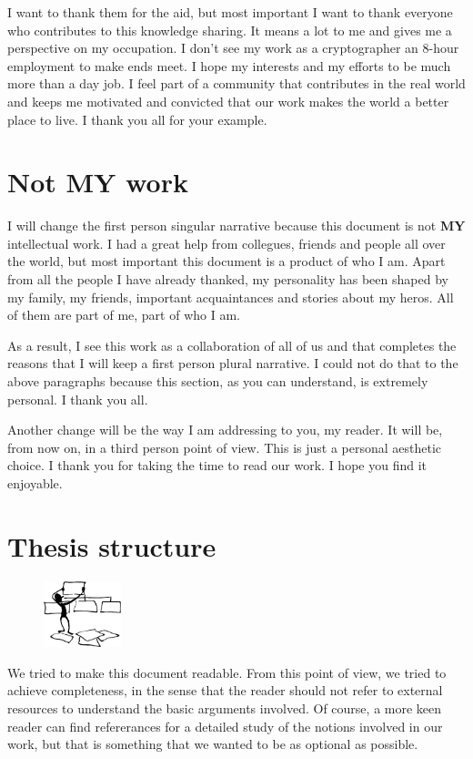 I want to thank them for the aid, but most important I want to thank everyone who contributes to this knowledge sharing. It means a lot to me and gives me a perspective on my occupation. I don't see my work as a cryptographer an 8-hour employment to make ends meet. I hope my interests and my efforts to be much more than a day job. I feel part of a community that contributes in the real world and keeps me motivated and convicted that our work makes the world a better place to live. I thank you all for your example.
%
\section{Not MY work}
I will change the first person singular narrative because this document is not \textbf{MY} intellectual work. I had a great help from collegues, friends and people all over the world, but most important this document is a product of who I am. Apart from all the people I have already thanked, my personality has been shaped by my family, my friends, important acquaintances and stories about my heros. All of them are part of me, part of who I am.

As a result, I see this work as a collaboration of all of us and that completes the reasons that I will keep a first person plural narrative. I could not do that to the above paragraphs because this section, as you can understand, is extremely personal. I thank you all.

Another change will be the way I am addressing to you, my reader. It will be, from now on, in a third person point of view. This is just a personal aesthetic choice. I thank you for taking the time to read our work. I hope you find it enjoyable.

\section{Thesis structure}
\setlength{\intextsep}{2pt}
\begin{figure}
\centering
\includegraphics[width=0.2\textwidth]{Images/Introduction/structure.png}
\end{figure}
We tried to make this document readable. From this point of view, we tried to achieve completeness, in the sense that the reader should not refer to external resources to understand the basic arguments involved. Of course, a more keen reader can find refererances for a detailed study of the notions involved in our work, but that is something that we wanted to be as optional as possible.

